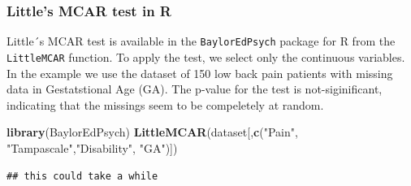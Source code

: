 \documentclass[]{book}
\newenvironment{Shaded}{\begin{snugshade}}{\end{snugshade}}
\newcommand{\KeywordTok}[1]{\textcolor[rgb]{0.13,0.29,0.53}{\textbf{#1}}}
\newcommand{\StringTok}[1]{\textcolor[rgb]{0.31,0.60,0.02}{#1}}
\newcommand{\NormalTok}[1]{#1}
\begin{document}
\subsubsection{Little's MCAR test in R}\label{littles-mcar-test-in-r}

Little´s MCAR test is available in the \texttt{BaylorEdPsych} package
for R from the \texttt{LittleMCAR} function. To apply the test, we
select only the continuous variables. In the example we use the dataset
of 150 low back pain patients with missing data in Gestatstional Age
(GA). The p-value for the test is not-siginificant, indicating that the
missings seem to be compeletely at random.

\begin{Shaded}
\begin{Highlighting}[]
\KeywordTok{library}\NormalTok{(BaylorEdPsych)}
\KeywordTok{LittleMCAR}\NormalTok{(dataset[,}\KeywordTok{c}\NormalTok{(}\StringTok{"Pain"}\NormalTok{, }\StringTok{"Tampascale"}\NormalTok{,}\StringTok{"Disability"}\NormalTok{, }\StringTok{"GA"}\NormalTok{)])}
\end{Highlighting}
\end{Shaded}

\begin{verbatim}
## this could take a while
\end{verbatim}
\end{document}
